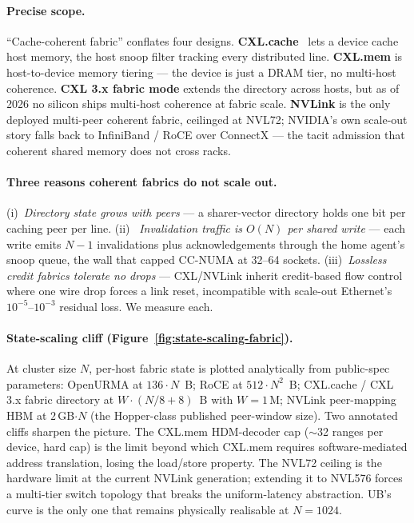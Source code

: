 \documentclass[10pt,twocolumn]{article}
\begin{document}
\paragraph{Precise scope.} ``Cache-coherent fabric'' conflates
four designs. \textbf{CXL.cache}~\cite{cxl} lets a device cache
host memory, the host snoop filter tracking every distributed line.
\textbf{CXL.mem} is host-to-device memory tiering --- the device is
just a DRAM tier, no multi-host coherence. \textbf{CXL 3.x fabric
mode} extends the directory across hosts, but as of 2026 no silicon
ships multi-host coherence at fabric scale. \textbf{NVLink} is the
only deployed multi-peer coherent fabric, ceilinged at NVL72;
NVIDIA's own scale-out story falls back to InfiniBand / RoCE over
ConnectX --- the tacit admission that coherent shared memory does
not cross racks.

\paragraph{Three reasons coherent fabrics do not scale out.}
(i)~\emph{Directory state grows with peers} --- a sharer-vector
directory holds one bit per caching peer per line. (ii)~\emph{
Invalidation traffic is $O(N)$ per shared write} --- each write
emits $N{-}1$ invalidations plus acknowledgements through the home
agent's snoop queue, the wall that capped CC-NUMA at 32--64
sockets. (iii)~\emph{Lossless credit fabrics tolerate no drops} ---
CXL/NVLink inherit credit-based flow control where one wire drop
forces a link reset, incompatible with scale-out Ethernet's
$10^{-5}$--$10^{-3}$ residual loss. We measure each.

\paragraph{State-scaling cliff (Figure~\ref{fig:state-scaling-fabric}).}
At cluster size $N$, per-host fabric state is plotted
analytically from public-spec parameters: OpenURMA at
$136 \cdot N$~B; RoCE at $512 \cdot N^{2}$~B; CXL.cache /
CXL 3.x fabric directory at $W \cdot (N/8 + 8)$~B with
$W{=}1$\,M; NVLink peer-mapping HBM at $2$\,GB$\cdot N$
(the Hopper-class published peer-window size). Two annotated
cliffs sharpen the picture. The CXL.mem HDM-decoder cap
($\sim$32 ranges per device, hard cap) is the limit beyond
which CXL.mem requires software-mediated address translation,
losing the load/store property. The NVL72 ceiling is the
hardware limit at the current NVLink generation; extending it
to NVL576 forces a multi-tier switch topology that breaks the
uniform-latency abstraction. UB's curve is the only one that
remains physically realisable at $N{=}1024$.
\end{document}

